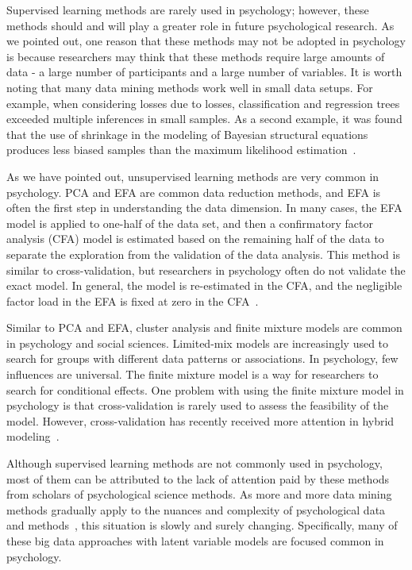 Supervised learning methods are rarely used in psychology; however,
 these methods should and will play a greater role in future 
psychological research. As we pointed out, one reason that these 
methods may not be adopted in psychology is because researchers may
 think that these methods require large amounts of data - a large 
number of participants and a large number of variables. It is worth
 noting that many data mining methods work well in small data 
setups. For example, when considering losses due to losses, 
classification and regression trees exceeded multiple inferences in 
small samples. As a second example, it was found that the use of 
shrinkage in the modeling of Bayesian 
structural equations produces less biased samples than the maximum
 likelihood estimation~\cite{editor11}.

As we have pointed out, unsupervised learning methods are very 
common in psychology. PCA and EFA are common data reduction 
methods, and EFA is often the first step in understanding the data
 dimension. In many cases, the EFA model is applied to one-half of
 the data set, and then a confirmatory factor analysis (CFA) model
 is estimated based on the remaining half of the data to separate 
the exploration from the validation of the data analysis. This 
method is similar to cross-validation, but researchers in 
psychology often do not validate the exact model. In general, the 
model is re-estimated in the CFA, and the negligible factor load 
in the EFA is fixed at zero in the CFA~\cite{editor11}.

Similar to PCA and EFA, cluster analysis and finite mixture models
 are common in psychology and social sciences. Limited-mix models 
are increasingly used to search for groups with different data 
patterns or associations. In psychology, few influences are 
universal. The finite mixture model is a way for researchers to 
search for conditional effects. One problem with using the finite 
mixture model in psychology is that cross-validation is rarely used
 to assess the feasibility of the model. However, cross-validation
 has recently received more attention in hybrid modeling~\cite{editor11}.

Although supervised learning methods are not commonly used in 
psychology, most of them can be attributed to the lack of attention
 paid by these methods from scholars of psychological science 
methods. As more and more data mining methods gradually apply to 
the nuances and complexity of psychological data and methods~\cite{editor11}, 
this situation is 
slowly and surely changing. Specifically, many of these big data 
approaches with latent variable models are focused common in psychology.

